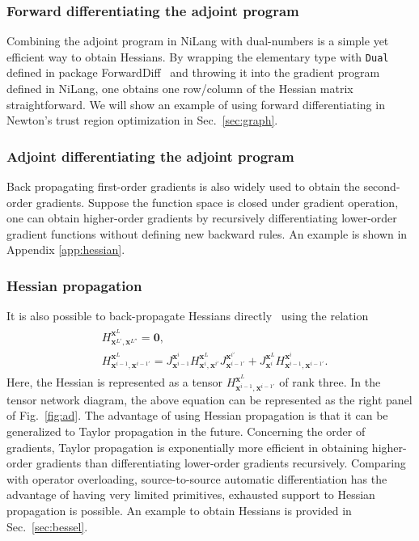 \documentclass[aps,twocolumn,longbibliography,english,superscriptaddress]{revtex4-1}
\newcommand{\<}{\langle}
\renewcommand{\>}{\rangle}
\newcommand{\out}{{\vx^L}}
\newcommand{\vx}{{\mathbf{x}}}
\newcommand{\Fig}[1]{Fig.~\ref{#1}}
\newcommand{\Sec}[1]{Sec.~\ref{#1}}
\newcommand{\App}[1]{Appendix \ref{#1}}
\theoremstyle{definition}\newtheorem{definition}{\textit{Definition}}
\begin{document}
\subsubsection{Forward differentiating the adjoint program}\label{sec:dualhessian}
Combining the adjoint program in NiLang with dual-numbers is a simple yet efficient way to obtain Hessians.
By wrapping the elementary type with \texttt{Dual} defined in package ForwardDiff~\cite{Revels2016} and throwing it into the gradient program defined in NiLang,
one obtains one row/column of the Hessian matrix straightforward.
We will show an example of using forward differentiating in Newton's trust region optimization in \Sec{sec:graph}.

\subsubsection{Adjoint differentiating the adjoint program}\label{sec:simplehessian}
Back propagating first-order gradients is also widely used to obtain the second-order gradients. Suppose the function space is closed under gradient operation, one can obtain higher-order gradients by recursively differentiating lower-order gradient functions without defining new backward rules. An example is shown in \App{app:hessian}.

\subsubsection{Hessian propagation}\label{sec:taylor}
It is also possible to back-propagate Hessians directly~\cite{Martens2012} using the relation
\begin{align}
    \begin{split}
        &H^{\out}_{\vx^{L'},\vx^{L''}} = \mathbf{0},\\
        &H^{\out}_{\vx^{i-1},\vx^{i-1'}} = J^{\vx^i}_{\vx^{i-1}} H^{\out}_{\vx^i, \vx^{i'}} J^{\vx^{i'}}_{\vx^{i-1'}} + J^{\out}_{\vx^i} H^{\vx^i}_{\vx^{i-1}, \vx^{i-1'}}.
    \end{split}
\end{align}
Here, the Hessian is represented as a tensor $H^{\out}_{\vx^{i-1},\vx^{i-1'}}$ of rank three.
In the tensor network diagram, the above equation can be represented as the right panel of \Fig{fig:ad}.
The advantage of using Hessian propagation is that it can be generalized to Taylor propagation in the future.
Concerning the order of gradients, Taylor propagation is exponentially more efficient in obtaining higher-order gradients than differentiating lower-order gradients recursively. %
Comparing with operator overloading, source-to-source automatic differentiation has the advantage of having very limited primitives, exhausted support to Hessian propagation is possible.
An example to obtain Hessians is provided in \Sec{sec:bessel}.
\end{document}
